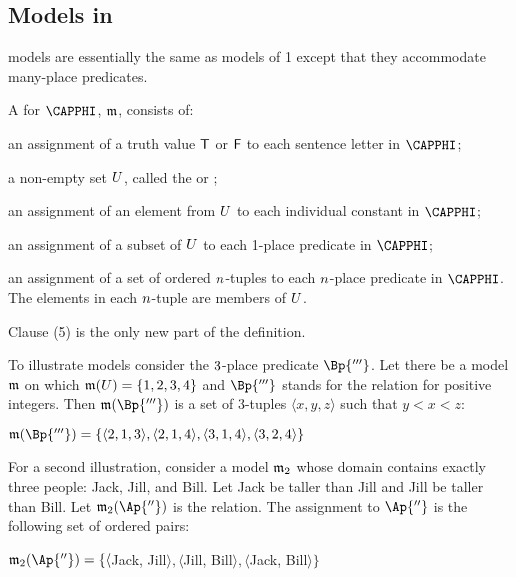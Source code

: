 \subsection{Models in \GQL{}}\label{Interpretations in GQL}
\GQL{} models are essentially the same as models of \GQL{}1 except that they accommodate many-place predicates.

\begin{majorILnc}{} 
	A  for $\CAPPHI$, $\mathfrak{m}$, consists of:
	\begin{cenumerate}
		\item an assignment of a truth value $\mathsf{T}$ or $\mathsf{F}$ to each sentence letter in $\CAPPHI$; 
		\item a non-empty set $U$, called the  or ;
		\item an assignment of an element from $U$ to each individual constant in $\CAPPHI$;
		\item an assignment of a subset of $U$ to each 1-place predicate in $\CAPPHI$;
		\item an assignment of a set of ordered $n$-tuples to each $n$-place predicate in $\CAPPHI$.
		The elements in each $n$-tuple are members of $U$.
	\end{cenumerate}
\end{majorILnc}

\noindent{} Clause (5) is the only new part of the definition.

To illustrate \GQL{} models consider the $3$-place predicate $\Bp{'''}$.
Let there be a model $\mathfrak{m}$ on which $\mathfrak{m}(U)=\left\{1,2,3,4\right\}$ and $\Bp{'''}$ stands for the  relation for positive integers.
Then $\IntA(\Bp{'''})$ is a set of $3$-tuples $\langle x, y, z\rangle$ such that $y<x<z$:

\bigskip
\noindent{}$\IntA(\Bp{'''})=\{\langle 2, 1, 3\rangle, \langle 2, 1, 4\rangle, \langle 3, 1, 4\rangle, \langle 3, 2, 4\rangle\}$ 
\bigskip

For a second illustration, consider a model $\mathfrak{m}_2$ whose domain contains exactly three people: Jack, Jill, and Bill.
Let Jack be taller than Jill and Jill be taller than Bill.
Let $\IntA_2(\Ap{''})$ is the  relation.
The assignment to $\Ap{''}$ is the following set of ordered pairs:

\bigskip
\noindent{}$\IntA_2(\Ap{''})=\{\langle$Jack, Jill$\rangle, \langle$Jill, Bill$\rangle, \langle$Jack, Bill$\rangle\}$ 
\bigskip

